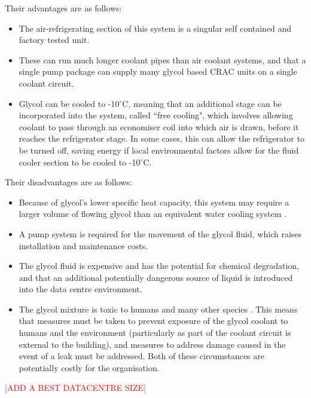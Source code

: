 Their advantages are as follows:
\begin{itemize}
   \item The air-refrigerating section of this system is a singular self contained and factory tested unit.
   \item These can run much longer coolant pipes than air coolant systems, and that a single pump package can supply many glycol based \gls{CRAC} units on a single coolant circuit.
   \item Glycol can be cooled to -10$^{\circ}$C, meaning that an additional stage can be incorporated into the system, called ``free cooling", which involves allowing coolant to pass through an economiser coil into which air is drawn, before it reaches the refrigerator stage. In some cases, this can allow the refrigerator to be turned off, saving energy if local environmental factors allow for the fluid cooler section to be cooled to -10$^{\circ}$C.
\end{itemize}

Their disadvantages are as follows:
\begin{itemize}
   \item Because of glycol's lower specific heat capacity, this system may require a larger volume of flowing glycol than an equivalent water cooling system \cite{EngineeringToolBoxEthyleneGlycolHeatTransferFluid}. 
   \item A pump system is required for the movement of the glycol fluid, which raises installation and maintenance costs.
   \item The glycol fluid is expensive and has the potential for chemical degradation, and that an additional potentially dangerous source of liquid is introduced into the \gls{data centre} environment.
   \item The glycol mixture is toxic to humans \cite{friedmanConsequencesOfEthyleneGlycolPoisoning} and many other species \cite[8.3 Environmental risk factors]{CICAEthyleneGlycolEnvironmentalAspects}. This means that measures must be taken to prevent exposure of the glycol coolant to humans and the environment (particularly as part of the coolant circuit is external to the building), and measures to address damage caused in the event of a leak must be addressed. Both of these circumstances are potentially costly for the organisation.
\end{itemize} 

\textcolor{red}{[ADD A BEST DATACENTRE SIZE]}
   
